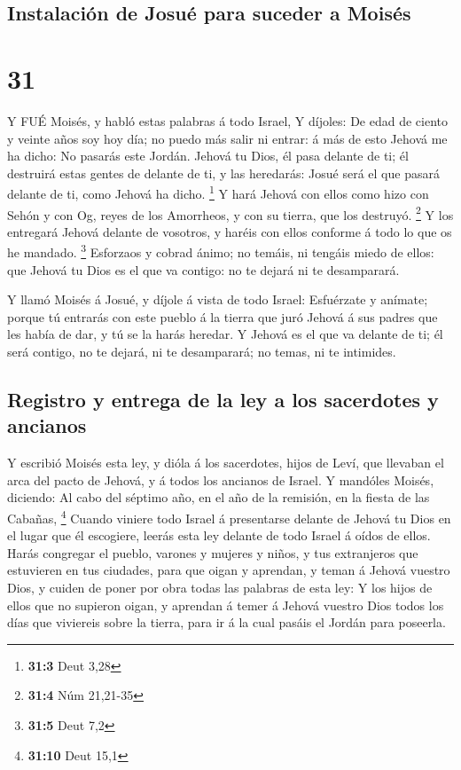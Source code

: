 \hypertarget{instalaciuxf3n-de-josuuxe9-para-suceder-a-moisuxe9s}{%
\subsection{Instalación de Josué para suceder a
Moisés}\label{instalaciuxf3n-de-josuuxe9-para-suceder-a-moisuxe9s}}

\hypertarget{section-30}{%
\section{31}\label{section-30}}

 Y FUÉ Moisés, y habló estas palabras á todo Israel,
 Y díjoles: De edad de ciento y veinte años soy hoy día; no
puedo más salir ni entrar: á más de esto Jehová me ha dicho: No pasarás
este Jordán.  Jehová tu Dios, él pasa delante de ti; él
destruirá estas gentes de delante de ti, y las heredarás: Josué será el
que pasará delante de ti, como Jehová ha dicho. \footnote{\textbf{31:3}
  Deut 3,28}  Y hará Jehová con ellos como hizo con Sehón y
con Og, reyes de los Amorrheos, y con su tierra, que los destruyó.
\footnote{\textbf{31:4} Núm 21,21-35}  Y los entregará
Jehová delante de vosotros, y haréis con ellos conforme á todo lo que os
he mandado. \footnote{\textbf{31:5} Deut 7,2}  Esforzaos y
cobrad ánimo; no temáis, ni tengáis miedo de ellos: que Jehová tu Dios
es el que va contigo: no te dejará ni te desamparará.

 Y llamó Moisés á Josué, y díjole á vista de todo Israel:
Esfuérzate y anímate; porque tú entrarás con este pueblo á la tierra que
juró Jehová á sus padres que les había de dar, y tú se la harás heredar.
 Y Jehová es el que va delante de ti; él será contigo, no te
dejará, ni te desamparará; no temas, ni te intimides.

\hypertarget{registro-y-entrega-de-la-ley-a-los-sacerdotes-y-ancianos}{%
\subsection{Registro y entrega de la ley a los sacerdotes y
ancianos}\label{registro-y-entrega-de-la-ley-a-los-sacerdotes-y-ancianos}}

 Y escribió Moisés esta ley, y dióla á los sacerdotes, hijos
de Leví, que llevaban el arca del pacto de Jehová, y á todos los
ancianos de Israel.  Y mandóles Moisés, diciendo: Al cabo
del séptimo año, en el año de la remisión, en la fiesta de las Cabañas,
\footnote{\textbf{31:10} Deut 15,1}  Cuando viniere todo
Israel á presentarse delante de Jehová tu Dios en el lugar que él
escogiere, leerás esta ley delante de todo Israel á oídos de ellos.
 Harás congregar el pueblo, varones y mujeres y niños, y
tus extranjeros que estuvieren en tus ciudades, para que oigan y
aprendan, y teman á Jehová vuestro Dios, y cuiden de poner por obra
todas las palabras de esta ley:  Y los hijos de ellos que
no supieron oigan, y aprendan á temer á Jehová vuestro Dios todos los
días que viviereis sobre la tierra, para ir á la cual pasáis el Jordán
para poseerla.

